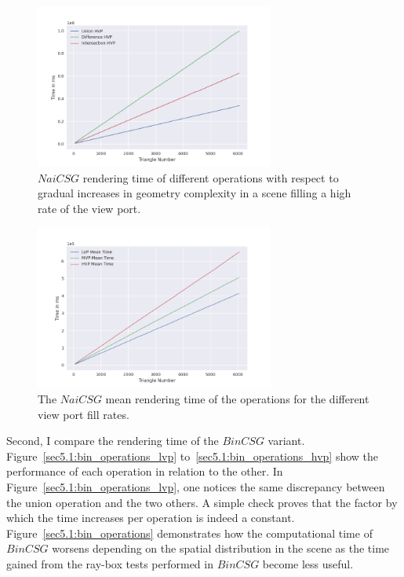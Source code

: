 \documentclass[a4paper,11pt,oneside]{article}
\begin{document}
\begin{figure}[H]
	\centering
	\includegraphics[width=0.7\textwidth]{section5/plots/naive_csg_hvp.png}
	\caption{$NaiCSG$ rendering time of different operations with respect to gradual increases in geometry complexity in a scene filling a high rate of the view port.}
	\label{sec5.1:naive_operations_hvp}
\end{figure}

\begin{figure}[H]
	\centering
	\includegraphics[width=0.7\textwidth]{section5/plots/naive_csg_mean.png}
	\caption{The $NaiCSG$ mean rendering time of the operations for the different view port fill rates.}
	\label{sec5.1:naive_operations}
\end{figure}

Second, I compare the rendering time of the $BinCSG$ variant. Figure~\ref{sec5.1:bin_operations_lvp} to~\ref{sec5.1:bin_operations_hvp} show the performance of each operation in relation to the other. In Figure~\ref{sec5.1:bin_operations_lvp}, one notices the same discrepancy between the union operation and the two others. A simple check proves that the factor by which the time increases per operation is indeed a constant. Figure~\ref{sec5.1:bin_operations} demonstrates how the computational time of $BinCSG$ worsens depending on the spatial distribution in the scene as the time gained from the ray-box tests performed in $BinCSG$ become less useful.
\end{document}
